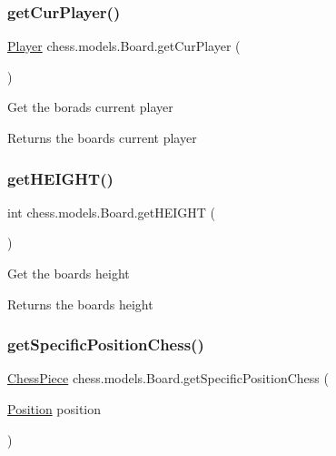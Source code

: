 \subsubsection{\texorpdfstring{get\+Cur\+Player()}{getCurPlayer()}}
{\footnotesize\ttfamily \mbox{\hyperlink{enumchess_1_1models_1_1enums_1_1_player}{Player}} chess.\+models.\+Board.\+get\+Cur\+Player (\begin{DoxyParamCaption}{ }\end{DoxyParamCaption})}

Get the borad\textquotesingle{}s current player

\begin{DoxyReturn}{Returns}
the board\textquotesingle{}s current player 
\end{DoxyReturn}
\mbox{\label{classchess_1_1models_1_1_board_a28a3d4b9d0738a26666b7c97394242a9}} 
\subsubsection{\texorpdfstring{get\+H\+E\+I\+G\+H\+T()}{getHEIGHT()}}
{\footnotesize\ttfamily int chess.\+models.\+Board.\+get\+H\+E\+I\+G\+HT (\begin{DoxyParamCaption}{ }\end{DoxyParamCaption})}

Get the board\textquotesingle{}s height

\begin{DoxyReturn}{Returns}
the board\textquotesingle{}s height 
\end{DoxyReturn}
\mbox{\label{classchess_1_1models_1_1_board_a3e21ecd167f3c80dfd260e9acde208c6}} 
\subsubsection{\texorpdfstring{get\+Specific\+Position\+Chess()}{getSpecificPositionChess()}}
{\footnotesize\ttfamily \mbox{\hyperlink{classchess_1_1models_1_1_chess_piece}{Chess\+Piece}} chess.\+models.\+Board.\+get\+Specific\+Position\+Chess (\begin{DoxyParamCaption}\item[{\mbox{\hyperlink{classchess_1_1models_1_1_position}{Position}}}]{position }\end{DoxyParamCaption})}


